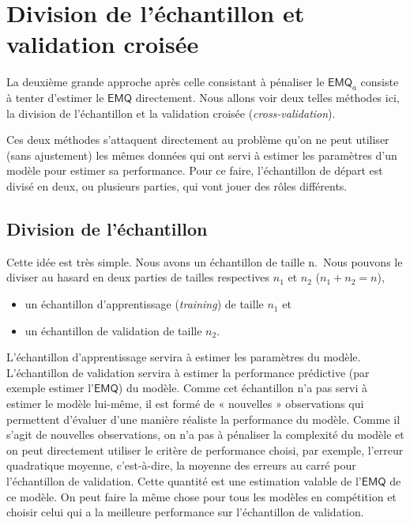 \documentclass[
]{book}
\providecommand{\tightlist}{%
  \setlength{\itemsep}{0pt}\setlength{\parskip}{0pt}}
\theoremstyle{definition}
\theoremstyle{definition}
\theoremstyle{definition}
\theoremstyle{remark}
\begin{document}
\hypertarget{division-de-luxe9chantillon-et-validation-croisuxe9e}{%
\section{Division de l'échantillon et validation croisée}\label{division-de-luxe9chantillon-et-validation-croisuxe9e}}

La deuxième grande approche après celle consistant à pénaliser le \(\mathsf{EMQ}_a\) consiste à tenter d'estimer le \(\mathsf{EMQ}\) directement. Nous allons voir deux telles méthodes ici, la division de l'échantillon et la validation croisée (\emph{cross-validation}).

Ces deux méthodes s'attaquent directement au problème qu'on ne peut utiliser (sans ajustement) les mêmes données qui ont servi à estimer les paramètres d'un modèle pour estimer sa performance. Pour ce faire, l'échantillon de départ est divisé en deux, ou plusieurs parties, qui vont jouer des rôles différents.

\hypertarget{division-de-luxe9chantillon}{%
\subsection{Division de l'échantillon}\label{division-de-luxe9chantillon}}

Cette idée est très simple. Nous avons un échantillon de taille n.~Nous pouvons le diviser au hasard en deux parties de tailles respectives \(n_1\) et \(n_2\) (\(n_1+n_2=n\)),

\begin{itemize}
\tightlist
\item
  un échantillon d'apprentissage (\emph{training}) de taille \(n_1\) et
\item
  un échantillon de validation de taille \(n_2\).
\end{itemize}

L'échantillon d'apprentissage servira à estimer les paramètres du modèle. L'échantillon de validation servira à estimer la performance prédictive (par exemple estimer l'\(\mathsf{EMQ}\)) du modèle. Comme cet échantillon n'a pas servi à estimer le modèle lui-même, il est formé de « nouvelles » observations qui permettent d'évaluer d'une manière réaliste la performance du modèle. Comme il s'agit de nouvelles observations, on n'a pas à pénaliser la complexité du modèle et on peut directement utiliser le critère de performance choisi, par exemple, l'erreur quadratique moyenne, c'est-à-dire, la moyenne des erreurs au carré pour l'échantillon de validation. Cette quantité est une estimation valable de l'\(\mathsf{EMQ}\) de ce modèle. On peut faire la même chose pour tous les modèles en compétition et choisir celui qui a la meilleure performance sur l'échantillon de validation.
\end{document}
